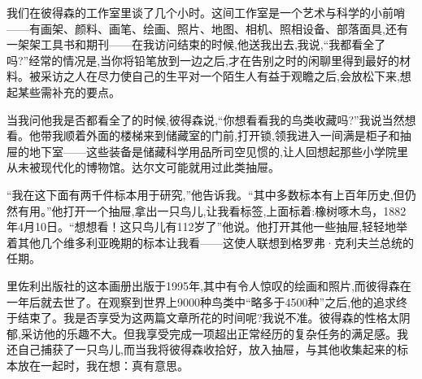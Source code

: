 我们在彼得森的工作室里谈了几个小时。这间工作室是一个艺术与科学的小前哨——有画架、颜料、画笔、绘画、照片、地图、相机、照相设备、部落面具,还有一架架工具书和期刊——在我访问结束的时候,他送我出去,我说,“我都看全了吗?”经常的情况是,当你将铅笔放到一边之后,才在告别之时的闲聊里得到最好的材料。被采访之人在尽力使自己的生平对一个陌生人有益于观瞻之后,会放松下来,想起某些需补充的要点。

当我问他我是否都看全了的时候,彼得森说,“你想看看我的鸟类收藏吗?”我说当然想看。他带我顺着外面的楼梯来到储藏室的门前,打开锁,领我进入一间满是柜子和抽屉的地下室——这些装备是储藏科学用品所司空见惯的,让人回想起那些小学院里从未被现代化的博物馆。达尔文可能就用过此类抽屉。

“我在这下面有两千件标本用于研究,”他告诉我。“其中多数标本有上百年历史,但仍然有用。”他打开一个抽屉,拿出一只鸟儿,让我看标签,上面标着:橡树啄木鸟，1882年4月10日。“想想看！这只鸟儿有112岁了”他说。他打开其他一些抽屉,轻轻地举着其他几个维多利亚晚期的标本让我看——这使人联想到格罗弗·克利夫兰总统的任期。

里佐利出版社的这本画册出版于1995年,其中有令人惊叹的绘画和照片,而彼得森在一年后就去世了。在观察到世界上9000种鸟类中“略多于4500种”之后,他的追求终于结束了。我是否享受为这两篇文章所花的时间呢?我说不准。彼得森的性格太阴郁,采访他的乐趣不大。但我享受完成一项超出正常经历的复杂任务的满足感。我还自己捕获了一只鸟儿,而当我将彼得森收拾好，放入抽屉，与其他收集起来的标本放在一起时，我在想：真有意思。